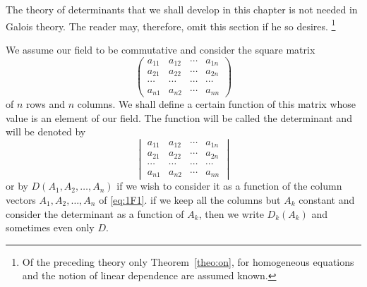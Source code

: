 \documentclass[10pt,leqno]{article}
\theoremstyle{definition}
\begin{document}
The theory of determinants that we shall develop in this chapter is not need\-ed in Galois theory.
The reader may, therefore, omit this section if he so desires.%
\footnote{Of the preceding theory only Theorem~\ref{theo:on}, for homogeneous equations and the notion of linear dependence are assumed known.}

We assume our field to be commutative and consider the square matrix
\begin{equation}
\label{eq:1F1}
\begin{pmatrix}
a_{11} & a_{12} & \cdots & a_{1n}
\\
a_{21} & a_{22} & \cdots & a_{2n}
\\
\cdots & \cdots & \cdots & \cdots
\\
a_{n1} & a_{n2} & \cdots & a_{nn}
\end{pmatrix}
\end{equation}
of $n$ rows and $n$ columns.
We shall define a certain function of this matrix whose value is an element of our field.
The function will be called the determinant and will be denoted by
\begin{equation}
\label{eq:1F2}
\begin{vmatrix}
a_{11} & a_{12} & \cdots & a_{1n}
\\
a_{21} & a_{22} & \cdots & a_{2n}
\\
\cdots & \cdots & \cdots & \cdots
\\
a_{n1} & a_{n2} & \cdots & a_{nn}
\end{vmatrix}
\end{equation}
or by $D(A_1, A_2, \ldots, A_n)$ if we wish to consider it as a function of the column vectors $A_1, A_2, \ldots, A_n$ of \eqref{eq:1F1}.
if we keep all the columns but $A_k$ constant and consider the determinant as a function of $A_k$, then we write $D_k(A_k)$ and sometimes even only $D$.
\end{document}
